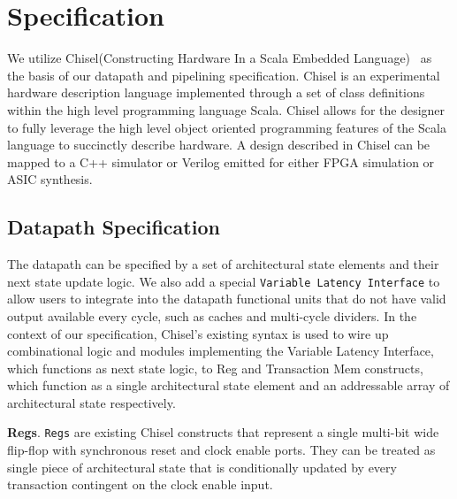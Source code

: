 \section{Specification}
We utilize Chisel(Constructing Hardware In a Scala Embedded
Language)~\cite{Bachrach:2012} as the basis of our datapath and
pipelining specification. Chisel is an experimental hardware
description language implemented through a set of class definitions
within the high level programming language Scala. Chisel allows for
the designer to fully leverage the high level object oriented
programming features of the Scala language to succinctly describe
hardware. A design described in Chisel can be mapped to a C++
simulator or Verilog emitted for either FPGA simulation or ASIC
synthesis.

\subsection{Datapath Specification}
The datapath can be specified by a set of architectural state elements
and their next state update logic. We also add a special {\tt Variable
Latency Interface} to allow users to integrate into the datapath
functional units that do not have valid output available every cycle,
such as caches and multi-cycle dividers. In the context of our
specification, Chisel's existing syntax is used to wire up
combinational logic and modules implementing the Variable Latency
Interface, which functions as next state logic, to Reg and Transaction
Mem constructs, which function as a single architectural state element
and an addressable array of architectural state respectively.

{\bf Regs}. {\tt Regs} are existing Chisel constructs that represent a
single multi-bit wide flip-flop with synchronous reset and clock
enable ports. They can be treated as single piece of architectural
state that is conditionally updated by every transaction contingent on
the clock enable input.

